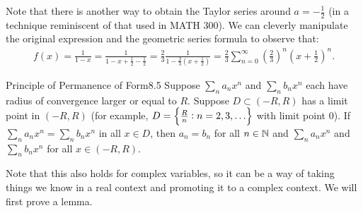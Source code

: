Note that there is another way to obtain the Taylor series around $a = -\frac{1}{2}$ (in a technique reminiscent of that used in MATH 300). We can cleverly manipulate the original expression and the geometric series formula to observe that:
\begin{align*}
    f(x) = \frac{1}{1 - x} = \frac{1}{1 - x + \frac{1}{2} - \frac{1}{2}} = \frac{2}{3}\frac{1}{1 - \frac{2}{3}(x + \frac{1}{2})} = \frac{2}{3}\sum_{n=0}^\infty \left(\frac{2}{3}\right)^n (x + \frac{1}{2})^n.
\end{align*}

\begin{theorem}{Principle of Permanence of Form}{8.5}
    Suppose $\sum_n a_n x^n$ and $\sum_n b_n x^n$ each have radius of convergence larger or equal to $R$. Suppose $D \subset (-R, R)$ has a limit point in $(-R, R)$ (for example, $D = \set{\frac{R}{n}: n = 2, 3, \ldots}$ with limit point $0$). If $\sum_n a_nx^n = \sum_n b_n x^n$ in all $x \in D$, then $a_n = b_n$ for all $n \in \mathbb{N}$ and $\sum_n a_nx^n$ and $\sum_n b_n x^n$ for all $x \in (-R, R)$. 
\end{theorem}
\noindent Note that this also holds for complex variables, so it can be a way of taking things we know in a real context and promoting it to a complex context. We will first prove a lemma.


